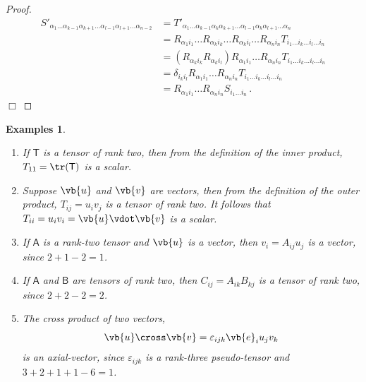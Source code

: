 \documentclass{article}
\theoremstyle{plain}\theoremheaderfont{\normalfont\itshape}\theorembodyfont{\rmfamily}\theoremseparator{.}\newtheorem*{rem}{Remark}\newtheorem*{ex}{Example}\newtheorem*{proof}{Proof}\newtheorem*{altp}{Alternative proof}
\theoremstyle{plain}\theoremheaderfont{\normalfont\bfseries}\theorembodyfont{\rmfamily}\theoremseparator{.}\newtheorem{thm}{Theorem}[section]\newtheorem{lem}[thm]{Lemma}\newtheorem{prop}[thm]{Proposition}\newtheorem*{cor}{Corollary}\newtheorem{defn}[thm]{Definition}\newtheorem{clm}[thm]{Claim}\newtheorem{clminproof}{Claim}
\theoremstyle{break}\theoremheaderfont{\normalfont\itshape}\theorembodyfont{\rmfamily}\theoremseparator{.\medskip}\newtheorem*{proofskip}{Proof}\newtheorem*{exs}{Examples}\newtheorem*{rems}{Remarks}
\theoremstyle{break}\theoremheaderfont{\normalfont\bfseries}\theorembodyfont{\rmfamily}\theoremseparator{.\medskip}\newtheorem{lemskip}[thm]{Lemma}\newtheorem{defnskip}[thm]{Definition}\newtheorem{propskip}[thm]{Proposition}\newtheorem{thmskip}[thm]{Theorem}
\numberwithin{equation}{section}
\newcommand{\qed}{\hfill\ensuremath{\Box}}
\begin{document}
	\begin{proof}
		\begin{align*}
			S'_{\alpha_1\dots\alpha_{k-1}\alpha_{k+1}\dots\alpha_{l-1}\alpha_{l+1}\dots\alpha_{n-2}}&=T'_{\alpha_1\dots\alpha_{k-1}\alpha_k\alpha_{k+1}\dots\alpha_{l-1}\alpha_k\alpha_{l+1}\dots\alpha_n}\\
			&=R_{\alpha_1i_1}\dots R_{\alpha_ki_k}\dots R_{\alpha_ki_l}\dots R_{\alpha_ni_n}T_{i_1\dots i_k\dots i_l\dots i_n}\\
			&=(R_{\alpha_ki_k}R_{\alpha_ki_l})R_{\alpha_1i_1}\dots R_{\alpha_ni_n}T_{i_1\dots i_k\dots i_l\dots i_n}\\
			&=\delta_{i_ki_l}R_{\alpha_1i_1}\dots R_{\alpha_ni_n}T_{i_1\dots i_k\dots i_l\dots i_n}\\
			&=R_{\alpha_1i_1}\dots R_{\alpha_ni_n}S_{i_1\dots i_{n}}\,.
		\end{align*}\qed
	\end{proof}
	\begin{exs}
		\begin{enumerate}[topsep=0pt,label=(\roman*)]
			\item If \(\mathsf{T}\) is a tensor of rank two, then from the definition of the inner product, \(T_{11}=\tr(\mathsf{T})\) is a scalar.
			\item Suppose \(\vb{u}\) and \(\vb{v}\) are vectors, then from the definition of the outer product, \(T_{ij}=u_iv_j\) is a tensor of rank two. It follows that \(T_{ii}=u_iv_i=\vb{u}\vdot\vb{v}\) is a scalar.
			\item If \(\mathsf{A}\) is a rank-two tensor and \(\vb{u}\) is a vector, then \(v_i=A_{ij}u_j\) is a vector, since \(2+1-2=1\).
			\item If \(\mathsf{A}\) and \(\mathsf{B}\) are tensors of rank two, then \(C_{ij}=A_{ik}B_{kj}\) is a tensor of rank two, since \(2+2-2=2\).
			\item The cross product of two vectors,
			\[\vb{u}\cross\vb{v}=\varepsilon_{ijk}\vb{e}_iu_jv_k\]
			is an axial-vector, since \(\varepsilon_{ijk}\) is a rank-three pseudo-tensor and \(3+2+1+1-6=1\).
		\end{enumerate}
	\end{exs}
\end{document}
